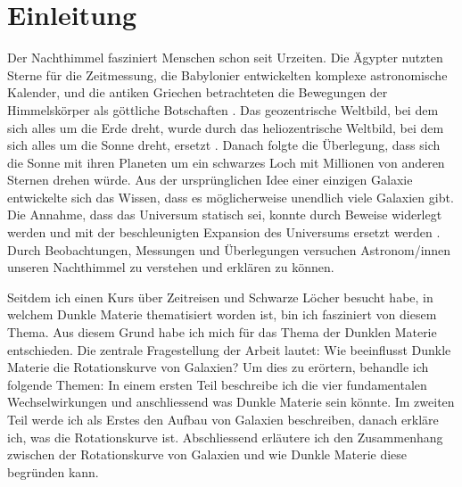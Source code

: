 
\section{Einleitung}

Der Nachthimmel fasziniert Menschen schon seit Urzeiten. Die Ägypter nutzten Sterne für die Zeitmessung, \cite{Hornung1998} die Babylonier entwickelten komplexe astronomische Kalender, und die antiken Griechen betrachteten die Bewegungen der Himmelskörper als göttliche Botschaften \cite{Friedrich1968}.
Das geozentrische Weltbild, bei dem sich alles um die Erde dreht, wurde durch das heliozentrische Weltbild, bei dem sich alles um die Sonne dreht, ersetzt \cite{Walker1999}. Danach folgte die Überlegung, dass sich die Sonne mit ihren Planeten um ein schwarzes Loch mit Millionen von anderen Sternen drehen würde. 
Aus der ursprünglichen Idee einer einzigen Galaxie entwickelte sich das Wissen, dass es möglicherweise unendlich viele Galaxien gibt. Die Annahme, dass das Universum statisch sei, konnte durch Beweise widerlegt werden und mit der beschleunigten Expansion des Universums ersetzt werden \cite{Bührke2022}. 
Durch Beobachtungen, Messungen und Überlegungen versuchen Astronom/innen unseren Nachthimmel zu verstehen und erklären zu können. 

Seitdem ich einen Kurs über Zeitreisen und Schwarze Löcher besucht habe, in welchem Dunkle Materie thematisiert worden ist, bin ich fasziniert von diesem Thema. Aus diesem Grund habe ich mich für das Thema der Dunklen Materie entschieden. Die zentrale Fragestellung der Arbeit lautet: Wie beeinflusst Dunkle Materie die Rotationskurve von Galaxien?
Um dies zu erörtern, behandle ich folgende Themen:
In einem ersten Teil beschreibe ich die vier fundamentalen Wechselwirkungen und anschliessend was Dunkle Materie sein könnte. Im zweiten Teil werde ich als Erstes den Aufbau von Galaxien beschreiben, danach erkläre ich, was die Rotationskurve ist. Abschliessend erläutere ich den Zusammenhang zwischen der Rotationskurve von Galaxien und wie Dunkle Materie diese begründen kann.
